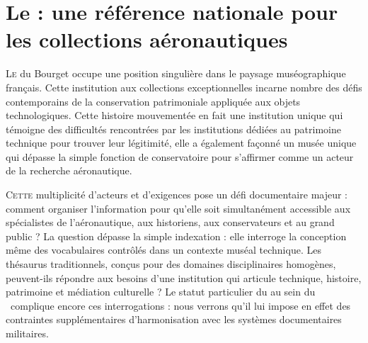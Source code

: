 \chapter[Une référence nationale]{\label{I-A}Le \mae : une référence nationale pour les collections aéronautiques}

\lettrine{L}e \maelong du Bourget occupe une position singulière dans le paysage muséographique français. Cette institution aux collections exceptionnelles incarne nombre des défis contemporains de la conservation patrimoniale appliquée aux objets technologiques. Cette histoire mouvementée en fait une institution unique qui témoigne des difficultés rencontrées par les institutions dédiées au patrimoine technique pour trouver leur légitimité, elle a également façonné un musée unique qui dépasse la simple fonction de conservatoire pour s'affirmer comme un acteur de la recherche aéronautique.






\bigskip
\bigskip
\bigskip

\lettrine{C}{ette} multiplicité d'acteurs et d'exigences pose un défi documentaire majeur : comment organiser l'information pour qu'elle soit simultanément accessible aux spécialistes de l'aéronautique, aux historiens, aux conservateurs et au grand public ? La question dépasse la simple indexation : elle interroge la conception même des vocabulaires contrôlés dans un contexte muséal technique. Les thésaurus traditionnels, conçus pour des domaines disciplinaires homogènes, peuvent-ils répondre aux besoins d'une institution qui articule technique, histoire, patrimoine et médiation culturelle ?
Le statut particulier du \mae au sein du \minarm~complique encore ces interrogations : nous verrons qu'il lui impose en effet des contraintes supplémentaires d'harmonisation avec les systèmes documentaires militaires.